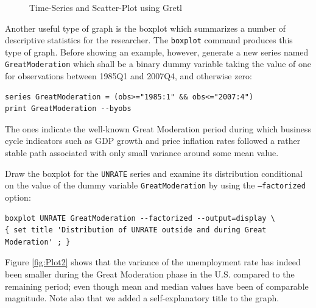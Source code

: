 \documentclass[11pt]{article}
\begin{document}
\begin{figure}[h!]
	\centering
	\caption{Time-Series and Scatter-Plot using Gretl}
	\label{fig:Plot1}
\end{figure}

Another useful type of graph is the boxplot which summarizes a number of descriptive statistics for the researcher. The \texttt{boxplot} command produces this type of graph. Before showing an example, however, generate a new series named \texttt{GreatModeration} which shall be a binary dummy variable taking the value of one for observations between 1985Q1 and 2007Q4, and otherwise zero:
\begin{Verbatim}[baselinestretch=0.75, fontsize=\small]
series GreatModeration = (obs>="1985:1" && obs<="2007:4")
print GreatModeration --byobs
\end{Verbatim}
The ones indicate the well-known Great Moderation period during which business cycle indicators such as GDP growth and price inflation rates followed a rather stable path associated with only small variance around some mean value.

Draw the boxplot for the \texttt{UNRATE} series and examine its distribution conditional on the value of the dummy variable \texttt{GreatModeration} by using the \texttt{---factorized} option: 
\begin{Verbatim}[baselinestretch=0.75, fontsize=\small]
boxplot UNRATE GreatModeration --factorized --output=display \
{ set title 'Distribution of UNRATE outside and during Great Moderation' ; }
\end{Verbatim}
Figure \ref{fig:Plot2} shows that the variance of the unemployment rate has indeed been smaller during the Great Moderation phase in the U.S. compared to the remaining period; even though mean and median values have been of comparable magnitude. Note also that we added a self-explanatory title to the graph.
\end{document}
